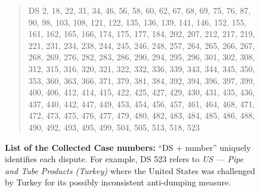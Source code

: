 \begin{figure}[t!]
  \begin{quote}
      DS 2,
      18,
      22,
      31,
      34,
      46,
      56,
      58,
      60,
      62,
      67,
      68,
      69,
      75,
      76,
      87,
      90,
      98,
      103,
      108,
      121,
      122,
      135,
      136,
      139,
      141,
      146,
      152,
      155,
      161,
      162,
      165,
      166,
      174,
      175,
      177,
      184,
      202,
      207,
      212,
      217,
      219,
      221,
      231,
      234,
      238,
      244,
      245,
      246,
      248,
      257,
      264,
      265,
      266,
      267,
      268,
      269,
      276,
      282,
      283,
      286,
      290,
      294,
      295,
      296,
      301,
      302,
      308,
      312,
      315,
      316,
      320,
      321,
      322,
      332,
      336,
      339,
      343,
      344,
      345,
      350,
      353,
      360,
      363,
      366,
      371,
      379,
      381,
      384,
      392,
      394,
      396,
      397,
      399,
      400,
      406,
      412,
      414,
      415,
      422,
      425,
      427,
      429,
      430,
      431,
      435,
      436,
      437,
      440,
      442,
      447,
      449,
      453,
      454,
      456,
      457,
      461,
      464,
      468,
      471,
      472,
      473,
      475,
      476,
      477,
      479,
      480,
      482,
      483,
      484,
      485,
      486,
      488,
      490,
      492,
      493,
      495,
      499,
      504,
      505,
      513,
      518,
      523
  \end{quote}
  \caption{
      \textbf{List of the Collected Case numbers:} ``DS + number'' uniquely identifies each dispute. For example, DS 523 refers to \textit{US — Pipe and Tube Products (Turkey)} where the United States was challenged by Turkey for its possibly inconsistent anti-dumping measure.
  }
  \label{fig:ds-cases-used}
\end{figure}
